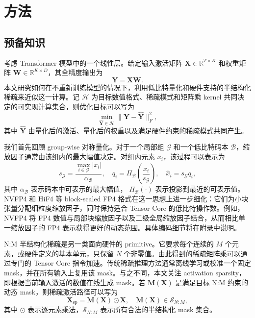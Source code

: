 \documentclass{article}
\begin{document}
\section{方法}

\subsection{预备知识}

考虑 Transformer 模型中的一个线性层。给定输入激活矩阵
$\mathbf{X} \in \mathbb{R}^{T \times K}$ 和权重矩阵
$\mathbf{W} \in \mathbb{R}^{K \times D}$，其全精度输出为
\begin{equation}
  \mathbf{Y} = \mathbf{X}\mathbf{W}.
  \label{eq:linear-layer}
\end{equation}
本文研究如何在不重新训练模型的情况下，利用低比特量化和硬件支持的半结构化稀疏来近似这一计算。记
$\mathcal{H}$ 为目标数值格式、稀疏模式和矩阵乘 kernel 共同决定的可实现计算集合，则优化目标可以写为
\begin{equation}
  \min_{\widehat{\mathbf{Y}} \in \mathcal{H}}
  \| \mathbf{Y} - \widehat{\mathbf{Y}} \|_F^2 ,
  \label{eq:hardware-objective}
\end{equation}
其中 $\widehat{\mathbf{Y}}$ 由量化后的激活、量化后的权重以及满足硬件约束的稀疏模式共同产生。

我们首先回顾 group-wise 对称量化。对于一个局部组 $\mathcal{G}$ 和一个低比特码本
$\mathcal{B}$，缩放因子通常由该组内的最大幅值决定。对组内元素 $x_i$，该过程可以表示为
\begin{equation}
  s_{\mathcal{G}} =
  \frac{\max_{i \in \mathcal{G}} |x_i|}{\alpha_{\mathcal{B}}},
  \quad
  q_i =
  \Pi_{\mathcal{B}}\left(\frac{x_i}{s_{\mathcal{G}}}\right),
  \quad
  \widehat{x}_i = s_{\mathcal{G}} q_i ,
  \label{eq:group-quant}
\end{equation}
其中 $\alpha_{\mathcal{B}}$ 表示码本中可表示的最大幅值，
$\Pi_{\mathcal{B}}(\cdot)$ 表示投影到最近的可表示值。NVFP4 和 HiF4 等 block-scaled FP4
格式在这一思想上进一步细化：它们为小块张量分配细粒度缩放因子，同时保持适合 Tensor Core 的低比特操作数。例如，NVFP4
将 FP4 数值与局部块缩放因子以及二级全局缩放因子结合，从而相比单一缩放因子的 FP4 表示获得更好的动态范围。具体编码细节将在附录中说明。

N:M 半结构化稀疏是另一类面向硬件的 primitive。它要求每个连续的 $M$ 个元素，或硬件定义的基本单元，只保留
$N$ 个非零值。由此得到的稀疏矩阵乘可以通过专门的 Tensor Core 指令加速。传统稀疏推理方法通常离线学习或校准一个固定
mask，并在所有输入上复用该 mask。与之不同，本文关注 activation sparsity，即根据当前输入激活的数值在线生成 mask。若
$\mathbf{M}(\mathbf{X})$ 是满足目标 N:M 约束的动态 mask，则稀疏激活路径可以写为
\begin{equation}
  \mathbf{X}_{\mathrm{sp}} =
  \mathbf{M}(\mathbf{X}) \odot \mathbf{X},
  \quad
  \mathbf{M}(\mathbf{X}) \in \mathcal{S}_{N:M},
  \label{eq:dynamic-mask}
\end{equation}
其中 $\odot$ 表示逐元素乘法，$\mathcal{S}_{N:M}$ 表示所有合法的半结构化 mask 集合。
\end{document}
